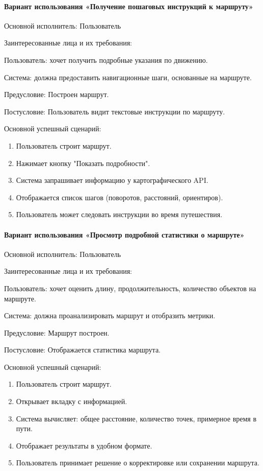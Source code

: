 \paragraph{Вариант использования «Получение пошаговых инструкций к маршруту»}

Основной исполнитель: Пользователь

Заинтересованные лица и их требования:

Пользователь: хочет получить подробные указания по движению.

Система: должна предоставить навигационные шаги, основанные на маршруте.

Предусловие: Построен маршрут.

Постусловие: Пользователь видит текстовые инструкции по маршруту.

Основной успешный сценарий:
\begin{enumerate}
	\item Пользователь строит маршрут.
	\item Нажимает кнопку "Показать подробности".
	\item Система запрашивает информацию у картографического API.
	\item Отображается список шагов (поворотов, расстояний, ориентиров).
	\item Пользователь может следовать инструкции во время путешествия.
\end{enumerate}

\paragraph{Вариант использования «Просмотр подробной статистики о маршруте»}

Основной исполнитель: Пользователь

Заинтересованные лица и их требования:

Пользователь: хочет оценить длину, продолжительность, количество объектов на маршруте.

Система: должна проанализировать маршрут и отобразить метрики.

Предусловие: Маршрут построен.

Постусловие: Отображается статистика маршрута.

Основной успешный сценарий:
\begin{enumerate}
	\item Пользователь строит маршрут.
	\item Открывает вкладку с информацией.
	\item Система вычисляет: общее расстояние, количество точек, примерное время в пути.
	\item Отображает результаты в удобном формате.
	\item Пользователь принимает решение о корректировке или сохранении маршрута.
\end{enumerate}


